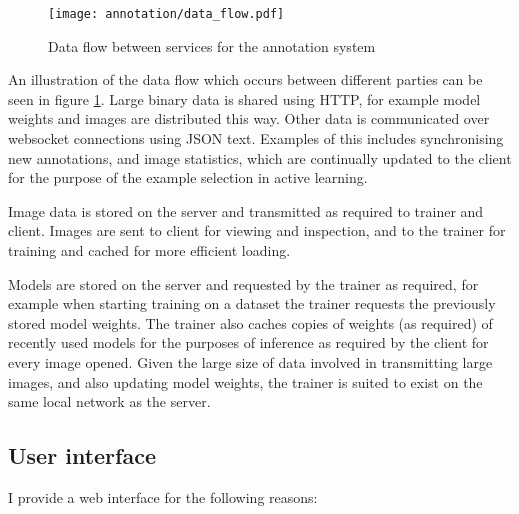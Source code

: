 \begin{figure}[h!]
  \centering
  \texttt{[image: annotation/data\_flow.pdf]}
  \caption{Data flow between services for the annotation system}  
  \label{fig:data_flow}
\end{figure}

An illustration of the data flow which occurs between different parties can be seen in figure \ref{fig:data_flow}. Large binary data is shared using \gls{HTTP}, for example model weights and images are distributed this way. Other data is communicated over websocket connections using \gls{JSON} text. Examples of this includes synchronising new annotations, and image statistics, which are continually updated to the client for the purpose of the example selection in active learning.

Image data is stored on the server and transmitted as required to trainer and client. Images are sent to client for viewing and inspection, and to the trainer for training and cached for more efficient loading. 

Models are stored on the server and requested by the trainer as required, for example when starting training on a dataset the trainer requests the previously stored model weights. The trainer also caches copies of weights (as required) of recently used models for the purposes of inference as required by the client for every image opened. Given the large size of data involved in transmitting large images, and also updating model weights, the trainer is suited to exist on the same local network as the server. 



\subsection {User interface}

I provide a web interface for the following reasons:

